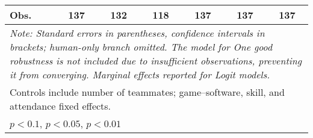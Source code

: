 \begin{tabular}{l*{6}{c}}
Obs.                &137   &132   &118   &137   &137   &137   \\
\hline
\hline\hline
\multicolumn{7}{p{0.8\textwidth}}{\it{Note:} Standard errors in parentheses, confidence intervals in brackets; human-only branch omitted. The model for One good robustness is not included due to insufficient observations, preventing it from converging. Marginal effects reported for Logit models.}\\
\multicolumn{7}{l}{Controls include number of teammates; game--software, skill, and attendance fixed effects.}\\
\multicolumn{7}{l}{\sym{*} \(p<0.1\), \sym{**} \(p<0.05\), \sym{***} \(p<0.01\)}\\
\end{tabular}
